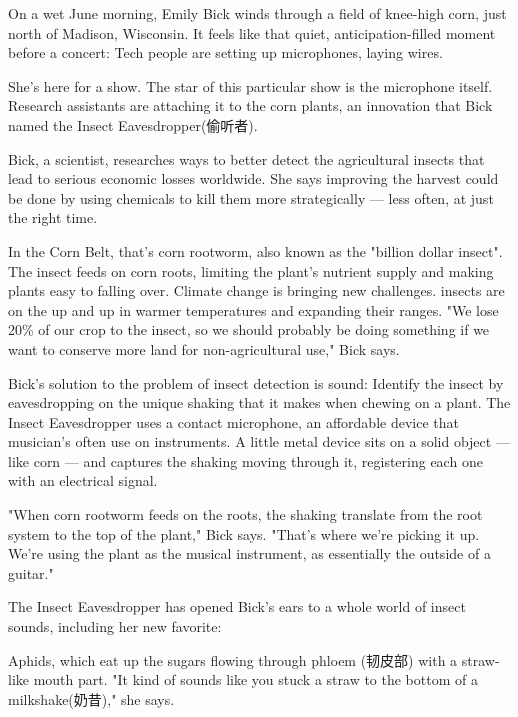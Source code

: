 \documentclass{英语试卷}
\begin{document}
\par On a wet June morning, Emily Bick winds through a field of knee-high corn, just north of Madison, Wisconsin. It feels like that quiet, anticipation-filled moment before a concert: Tech people are setting up microphones, laying wires.\par
\par She's here for a show. The star of this particular show is the microphone itself. Research assistants are attaching it to the corn plants, an innovation that Bick named the Insect Eavesdropper(偷听者).\par
\par Bick, a scientist, researches ways to better detect the agricultural insects that lead to serious economic losses worldwide. She says improving the harvest could be done by using chemicals to kill them more strategically — less often, at just the right time.\par
\par In the Corn Belt, that's corn rootworm, also known as the "billion dollar insect". The insect feeds on corn roots, limiting the plant's nutrient supply and making plants easy to falling over. Climate change is bringing new challenges. insects are on the up and up in warmer temperatures and expanding their ranges. "We lose 20\% of our crop to the insect, so we should probably be doing something if we want to conserve more land for non-agricultural use," Bick says.\par
\par Bick's solution to the problem of insect detection is sound: Identify the insect by eavesdropping on the unique shaking that it makes when chewing on a plant. The Insect Eavesdropper uses a contact microphone, an affordable device that musician's often use on instruments. A little metal device sits on a solid object — like corn — and captures the shaking moving through it, registering each one with an electrical signal.\par
\par "When corn rootworm feeds on the roots, the shaking translate from the root system to the top of the plant," Bick says. "That's where we're picking it up. We're using the plant as the musical instrument, as essentially the outside of a guitar."\par
\par The Insect Eavesdropper has opened Bick's ears to a whole world of insect sounds, including her new favorite:\par
\par Aphids, which eat up the sugars flowing through phloem (韧皮部) with a straw-like mouth part. "It kind of sounds like you stuck a straw to the bottom of a milkshake(奶昔)," she says.\par
\end{document}
